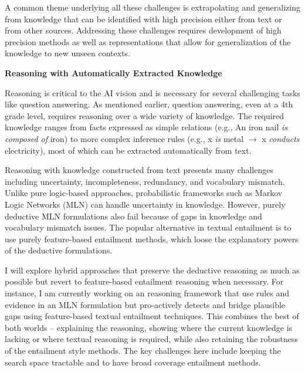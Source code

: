 \documentclass[a4paper,11pt,onecolumn]{article}
\begin{document}
A common theme underlying all these challenges is extrapolating and generalizing from knowledge that can be identified with high precision either from text or from other sources.  Addressing these challenges requires development of high precision methods as well as representations that allow for generalization of the knowledge to new unseen contexts. 

{\bf Reasoning with Automatically Extracted Knowledge}

Reasoning is critical to the AI vision and is necessary for several challenging tasks like question answering. As mentioned earlier, question answering, even at a 4th grade level, requires reasoning over a wide variety of knowledge. The required knowledge ranges from facts expressed as simple relations (e.g., {An iron nail {\em is composed of} iron}) to more complex inference rules (e.g., x {\em is} metal $\rightarrow$ x {\em conducts} electricity), most of which can be extracted automatically from text. 
 
Reasoning with knowledge constructed from text presents many challenges including uncertainty, incompleteness, redundancy, and vocabulary mismatch. 
Unlike pure logic-based approaches, probabilistic frameworks such as Markov Logic Networks (MLN) can handle uncertainty in knowledge.
However, purely deductive MLN formulations also fail because of gaps in knowledge and vocabulary mismatch issues. The popular alternative in textual entailment is to use purely feature-based entailment methods, which loose the explanatory powers of the deductive formulations. 

I will explore hybrid approaches that preserve the deductive reasoning as much as possible but revert to feature-based entailment reasoning when necessary. For instance, I am currently working on an reasoning framework that use rules and evidence in an MLN formulation but pro-actively detects and bridge plausible gaps using feature-based textual entailment techniques. This combines the best of both worlds -- explaining the reasoning, showing where the current knowledge is lacking or where textual reasoning is required, while also retaining the robustness of the entailment style methods. The key challenges here include keeping the search space tractable and to have broad coverage entailment methods. 
\end{document}
